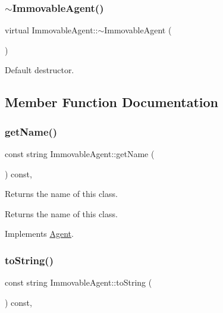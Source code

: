 \subsubsection{\texorpdfstring{$\sim$ImmovableAgent()}{~ImmovableAgent()}}
{\footnotesize\ttfamily virtual Immovable\+Agent\+::$\sim$\+Immovable\+Agent (\begin{DoxyParamCaption}{ }\end{DoxyParamCaption})\hspace{0.3cm}{\ttfamily [virtual]}}

Default destructor. 

\subsection{Member Function Documentation}
\mbox{\label{class_immovable_agent_ae8fbccc744f6f806e47dfd242fa67a1c}} 
\subsubsection{\texorpdfstring{getName()}{getName()}}
{\footnotesize\ttfamily const string Immovable\+Agent\+::get\+Name (\begin{DoxyParamCaption}{ }\end{DoxyParamCaption}) const\hspace{0.3cm}{\ttfamily [override]}, {\ttfamily [virtual]}}

Returns the name of this class. \begin{DoxyReturn}{Returns}
the name of this class. 
\end{DoxyReturn}


Implements \mbox{\hyperlink{class_agent_afe6c72d91baf9ee4fe77ea1ed7fef3ba}{Agent}}.

\mbox{\label{class_immovable_agent_a805b0d18035550d902d617a8c7ccc062}} 
\subsubsection{\texorpdfstring{toString()}{toString()}}
{\footnotesize\ttfamily const string Immovable\+Agent\+::to\+String (\begin{DoxyParamCaption}{ }\end{DoxyParamCaption}) const\hspace{0.3cm}{\ttfamily [override]}, {\ttfamily [virtual]}}

